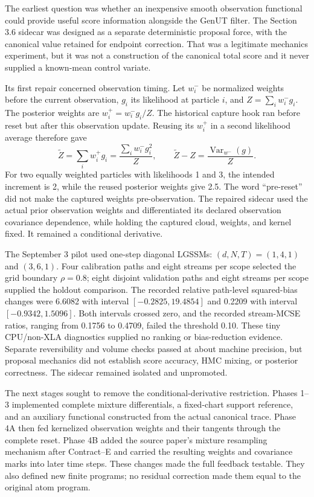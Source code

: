 \documentclass[11pt]{article}
\begin{document}
The earliest question was whether an inexpensive smooth observation
functional could provide useful score information alongside the GenUT
filter. The Section 3.6 sidecar was designed as a separate deterministic
proposal force, with the canonical value retained for endpoint correction.
That was a legitimate mechanics experiment, but it was not a construction of
the canonical total score and it never supplied a known-mean control variate.

Its first repair concerned observation timing. Let $w_i^-$ be normalized
weights before the current observation, $g_i$ its likelihood at particle $i$,
and $Z=\sum_i w_i^-g_i$. The posterior weights are $w_i^+=w_i^-g_i/Z$.
The historical capture hook ran before reset but after this observation
update. Reusing its $w_i^+$ in a second likelihood average therefore gave
\begin{equation}
 \widetilde Z=\sum_iw_i^+g_i
 =\frac{\sum_iw_i^-g_i^2}{Z},\qquad
 \widetilde Z-Z=\frac{\operatorname{Var}_{w^-}(g)}{Z}.
 \label{eq:historical-double-observation}
\end{equation}
For two equally weighted particles with likelihoods 1 and 3, the intended
increment is 2, while the reused posterior weights give 2.5. The word
``pre-reset'' did not make the captured weights pre-observation. The repaired
sidecar used the actual prior observation weights and differentiated its
declared observation covariance dependence, while holding the captured cloud,
weights, and kernel fixed. It remained a conditional derivative.

The September 3 pilot used one-step diagonal LGSSMs: $(d,N,T)=(1,4,1)$ and
$(3,6,1)$. Four calibration paths and eight streams per scope selected the
grid boundary $\rho=0.8$; eight disjoint validation paths and eight streams
per scope supplied the holdout comparison. The recorded relative
path-level squared-bias changes were 6.6082 with interval
$[-0.2825,19.4854]$ and 0.2209 with interval $[-0.9342,1.5096]$.
Both intervals crossed zero, and the recorded stream-MCSE ratios, ranging
from 0.1756 to 0.4709, failed the threshold 0.10. These tiny CPU/non-XLA
diagnostics supplied no ranking or bias-reduction evidence. Separate
reversibility and volume checks passed at about machine precision, but
proposal mechanics did not establish score accuracy, HMC mixing, or posterior
correctness. The sidecar remained isolated and unpromoted.

The next stages sought to remove the conditional-derivative restriction.
Phases 1--3 implemented complete mixture differentials, a fixed-chart support
reference, and an auxiliary functional constructed from the actual canonical
trace. Phase 4A then fed kernelized observation weights and their tangents
through the complete reset. Phase 4B added the source paper's mixture
resampling mechanism after Contract--E and carried the resulting weights and
covariance marks into later time steps. These changes made the full feedback
testable. They also defined new finite programs; no residual correction made
them equal to the original atom program.
\end{document}

